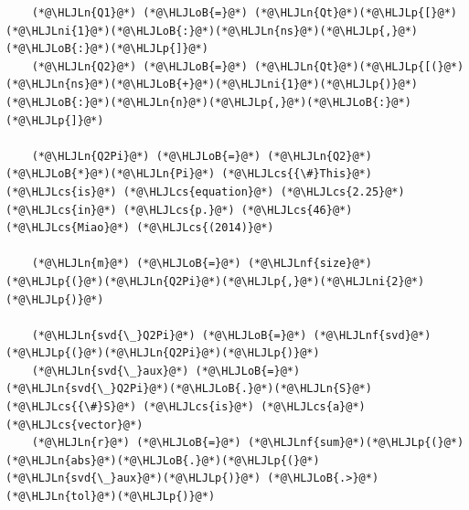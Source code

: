 \documentclass[12pt,a4paper]{article}
\newcommand{\HLJLn}[1]{#1}
\newcommand{\HLJLnf}[1]{\textcolor[RGB]{66,102,213}{#1}}
\newcommand{\HLJLni}[1]{\textcolor[RGB]{59,151,46}{#1}}
\newcommand{\HLJLoB}[1]{\textcolor[RGB]{102,102,102}{\textbf{#1}}}
\newcommand{\HLJLp}[1]{#1}
\newcommand{\HLJLcs}[1]{\textcolor[RGB]{153,153,119}{\textit{#1}}}
\begin{document}
\begin{lstlisting}
    (*@\HLJLn{Q1}@*) (*@\HLJLoB{=}@*) (*@\HLJLn{Qt}@*)(*@\HLJLp{[}@*)(*@\HLJLni{1}@*)(*@\HLJLoB{:}@*)(*@\HLJLn{ns}@*)(*@\HLJLp{,}@*)(*@\HLJLoB{:}@*)(*@\HLJLp{]}@*)
    (*@\HLJLn{Q2}@*) (*@\HLJLoB{=}@*) (*@\HLJLn{Qt}@*)(*@\HLJLp{[(}@*)(*@\HLJLn{ns}@*)(*@\HLJLoB{+}@*)(*@\HLJLni{1}@*)(*@\HLJLp{)}@*)(*@\HLJLoB{:}@*)(*@\HLJLn{n}@*)(*@\HLJLp{,}@*)(*@\HLJLoB{:}@*)(*@\HLJLp{]}@*)

    (*@\HLJLn{Q2Pi}@*) (*@\HLJLoB{=}@*) (*@\HLJLn{Q2}@*)(*@\HLJLoB{*}@*)(*@\HLJLn{Pi}@*) (*@\HLJLcs{{\#}This}@*) (*@\HLJLcs{is}@*) (*@\HLJLcs{equation}@*) (*@\HLJLcs{2.25}@*) (*@\HLJLcs{in}@*) (*@\HLJLcs{p.}@*) (*@\HLJLcs{46}@*) (*@\HLJLcs{Miao}@*) (*@\HLJLcs{(2014)}@*)

    (*@\HLJLn{m}@*) (*@\HLJLoB{=}@*) (*@\HLJLnf{size}@*)(*@\HLJLp{(}@*)(*@\HLJLn{Q2Pi}@*)(*@\HLJLp{,}@*)(*@\HLJLni{2}@*)(*@\HLJLp{)}@*)

    (*@\HLJLn{svd{\_}Q2Pi}@*) (*@\HLJLoB{=}@*) (*@\HLJLnf{svd}@*)(*@\HLJLp{(}@*)(*@\HLJLn{Q2Pi}@*)(*@\HLJLp{)}@*)
    (*@\HLJLn{svd{\_}aux}@*) (*@\HLJLoB{=}@*) (*@\HLJLn{svd{\_}Q2Pi}@*)(*@\HLJLoB{.}@*)(*@\HLJLn{S}@*) (*@\HLJLcs{{\#}S}@*) (*@\HLJLcs{is}@*) (*@\HLJLcs{a}@*) (*@\HLJLcs{vector}@*)
    (*@\HLJLn{r}@*) (*@\HLJLoB{=}@*) (*@\HLJLnf{sum}@*)(*@\HLJLp{(}@*)(*@\HLJLn{abs}@*)(*@\HLJLoB{.}@*)(*@\HLJLp{(}@*)(*@\HLJLn{svd{\_}aux}@*)(*@\HLJLp{)}@*) (*@\HLJLoB{.>}@*) (*@\HLJLn{tol}@*)(*@\HLJLp{)}@*)


\end{lstlisting}
\end{document}

